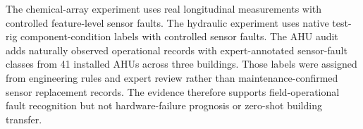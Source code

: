 \documentclass[10pt]{article}
\begin{document}
The chemical-array experiment uses real longitudinal measurements with controlled feature-level sensor faults. The hydraulic experiment uses native test-rig component-condition labels with controlled sensor faults. The AHU audit adds naturally observed operational records with expert-annotated sensor-fault classes from 41 installed AHUs across three buildings. Those labels were assigned from engineering rules and expert review rather than maintenance-confirmed sensor replacement records. The evidence therefore supports field-operational fault recognition but not hardware-failure prognosis or zero-shot building transfer.
\end{document}
